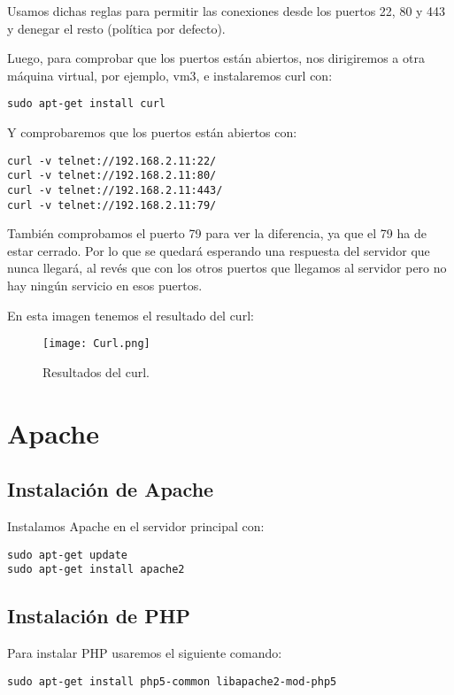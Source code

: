 \documentclass[12pt,letterpaper]{article}
\begin{document}
Usamos dichas reglas para permitir las conexiones desde los puertos 22, 80 y 443 y denegar el resto (política por defecto).

Luego, para comprobar que los puertos están abiertos, nos dirigiremos a otra máquina virtual, por ejemplo, vm3, e instalaremos curl con:
\begin{center}
	\texttt{sudo apt-get install curl}
\end{center}

Y comprobaremos que los puertos están abiertos con:
\begin{center}
	\texttt{curl -v telnet://192.168.2.11:22/ \\
		curl -v telnet://192.168.2.11:80/ \\
		curl -v telnet://192.168.2.11:443/ \\
	curl -v telnet://192.168.2.11:79/}
\end{center}

También comprobamos el puerto 79 para ver la diferencia, ya que el 79 ha de estar cerrado. Por lo que se quedará esperando una respuesta del servidor que nunca llegará, al revés que con los otros puertos que llegamos al servidor pero no hay ningún servicio en esos puertos.

En esta imagen tenemos el resultado del curl:
\begin{figure}[h]
	\centering
	\texttt{[image: Curl.png]}
	\caption{Resultados del curl.}
	
\end{figure}

\section{Apache}
\subsection{Instalación de Apache}
Instalamos Apache en el servidor principal con:
\begin{center}
	\texttt{sudo apt-get update\\sudo apt-get install apache2}
\end{center}

\subsection{Instalación de PHP}
Para instalar PHP usaremos el siguiente comando:
\begin{center}
	\texttt{sudo apt-get install php5-common libapache2-mod-php5}
\end{center}
\end{document}
